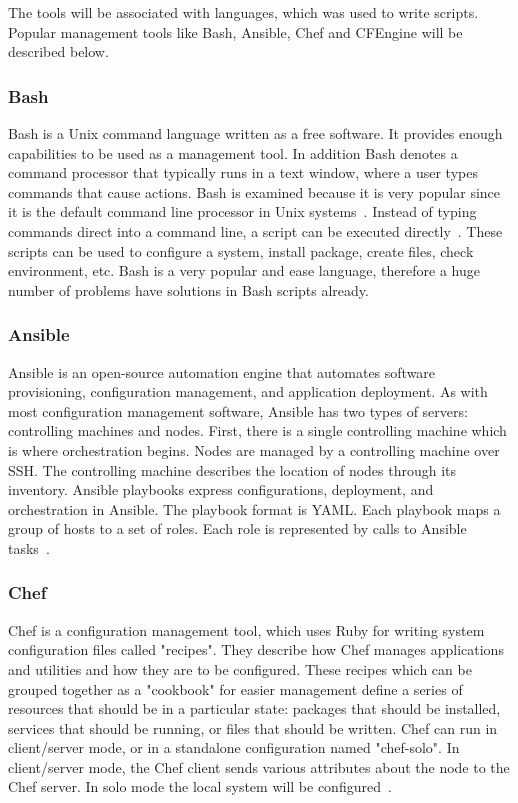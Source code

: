 The tools will be associated with languages, which was used to write scripts.
Popular management tools like Bash, Ansible, Chef and CFEngine will be described below.
\subsubsection*{Bash} \label{lang:bash}
Bash is a Unix command language written as a free software.
It provides enough capabilities to be used as a management tool.
In addition Bash denotes a command processor that typically runs in a text window, where a user types commands that cause actions.
Bash is examined because it is very popular since it is the default command line processor in Unix systems~\cite*{bashdef}.
Instead of typing commands direct into a command line, a script can be executed directly~\cite{bash}.
These scripts can be used to configure a system, install package, create files, check environment, etc.
Bash is a very popular and ease language, therefore a huge number of problems have solutions in Bash scripts already.
\subsubsection*{Ansible} \label{lang:ansible}
Ansible is an open-source automation engine that automates software provisioning, configuration management, and application deployment.
As with most configuration management software, Ansible has two types of servers: controlling machines and nodes.
First, there is a single controlling machine which is where orchestration begins.
Nodes are managed by a controlling machine over SSH.
The controlling machine describes the location of nodes through its inventory.
Ansible playbooks express configurations, deployment, and orchestration in Ansible.
The playbook format is YAML. 
Each playbook maps a group of hosts to a set of roles.
Each role is represented by calls to Ansible tasks~\cite{ansible}.
\subsubsection*{Chef} \label{lang:shef}
Chef is a configuration management tool, which uses Ruby for writing system configuration files called "recipes".
They describe how Chef manages applications and utilities and how they are to be configured.
These recipes which can be grouped together as a "cookbook" for easier management define a series of resources that should be in a particular state: packages that should be installed, services that should be running, or files that should be written.
Chef can run in client/server mode, or in a standalone configuration named "chef-solo".
In client/server mode, the Chef client sends various attributes about the node to the Chef server. 
In solo mode the local system will be configured~\cite{chef}.
